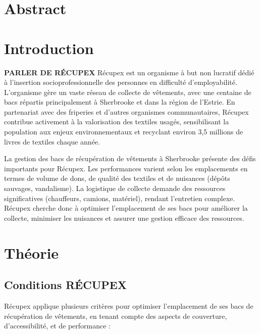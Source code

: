 \documentclass[11pt]{article}
\begin{document}

\tableofcontents
\newpage
\section*{Abstract}

\section{Introduction}
\textbf{PARLER DE RÉCUPEX}
Récupex est un organisme à but non lucratif dédié à l’insertion socioprofessionnelle des personnes en difficulté d’employabilité. L’organisme gère un vaste réseau de collecte de vêtements, avec une centaine de bacs répartis principalement à Sherbrooke et dans la région de l’Estrie. En partenariat avec des friperies et d’autres organismes communautaires, Récupex contribue activement à la valorisation des textiles usagés, sensibilisant la population aux enjeux environnementaux et recyclant environ 3,5 millions de livres de textiles chaque année.

La gestion des bacs de récupération de vêtements à Sherbrooke présente des défis importants pour Récupex. Les performances varient selon les emplacements en termes de volume de dons, de qualité des textiles et de nuisances (dépôts sauvages, vandalisme). La logistique de collecte demande des ressources significatives (chauffeurs, camions, matériel), rendant l'entretien complexe. Récupex cherche donc à optimiser l'emplacement de ses bacs pour améliorer la collecte, minimiser les nuisances et assurer une gestion efficace des ressources.

\section{Théorie}
\subsection{Conditions RÉCUPEX}
Récupex applique plusieurs critères pour optimiser l’emplacement de ses bacs de récupération de vêtements, en tenant compte des aspects de couverture, d'accessibilité, et de performance :
\end{document}
